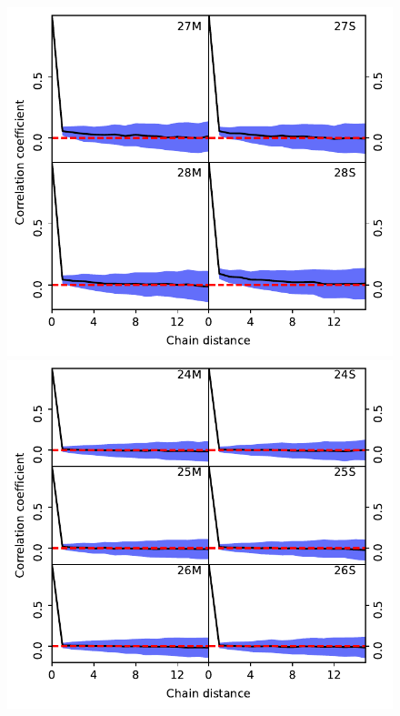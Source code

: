 \documentclass[twocolumn]{aa}
\begin{document}
\begin{figure}[t]
  \center
    \includegraphics[width=0.88\linewidth]{figs/corrlengths_030.pdf}\\\vspace*{-2mm}
    \includegraphics[width=0.88\linewidth]{figs/corrlengths_044.pdf}\\\vspace*{-2mm}

\end{figure}
\end{document}
